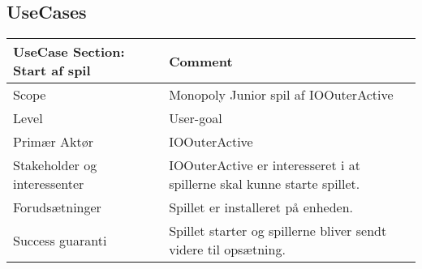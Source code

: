 \subsection{UseCases}
\begin{center}
    \begin{tabular}{ | m{10em} | m{10cm}| }
        \hline
            UseCase Section: Start af spil & Comment\\
        \hline
            Scope & Monopoly Junior spil af IOOuterActive\\
        \hline
            Level & User-goal\\
        \hline
            Primær Aktør & IOOuterActive\\
        \hline
            Stakeholder og interessenter
            & IOOuterActive er interesseret i at spillerne skal kunne starte spillet.\\
        \hline
            Forudsætninger & Spillet er installeret på enheden.\\
        \hline
            Success guaranti & Spillet starter og spillerne bliver sendt videre til opsætning.\\
        \hline
    \end{tabular}
\end{center}

